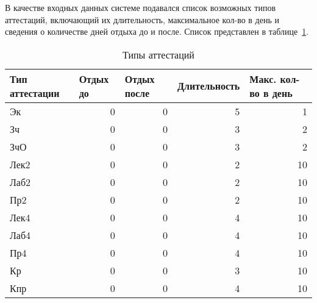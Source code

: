 В качестве входных данных системе подавался список возможных типов аттестаций, включающий их длительность, максимальное кол-во в день и сведения о количестве дней отдыха до и после. Список представлен в таблице~\ref{table:att}.
\begin{table}[htbp]
	\centering\small 
	\caption{Типы аттестаций}%
	\begin{tabular}{|l|r|r|r|r|}
		\hline
		Тип аттестации & \multicolumn{1}{l|}{Отдых до} & \multicolumn{1}{l|}{Отдых после} & \multicolumn{1}{l|}{Длительность} & \multicolumn{1}{l|}{Макс. кол-во в день} \\ \hline
		Эк             & 0                             & 0                                & 5                                 & 1                                        \\ \hline
		Зч             & 0                             & 0                                & 3                                 & 2                                        \\ \hline
		ЗчО            & 0                             & 0                                & 3                                 & 2                                        \\ \hline
		Лек2           & 0                             & 0                                & 2                                 & 10                                       \\ \hline
		Лаб2           & 0                             & 0                                & 2                                 & 10                                       \\ \hline
		Пр2            & 0                             & 0                                & 2                                 & 10                                       \\ \hline
		Лек4           & 0                             & 0                                & 4                                 & 10                                       \\ \hline
		Лаб4           & 0                             & 0                                & 4                                 & 10                                       \\ \hline
		Пр4            & 0                             & 0                                & 4                                 & 10                                       \\ \hline
		Кр             & 0                             & 0                                & 3                                 & 10                                       \\ \hline
		Кпр            & 0                             & 0                                & 4                                 & 10                                       \\ \hline
	\end{tabular} \label{table:att}
\end{table} 
\FloatBarrier

